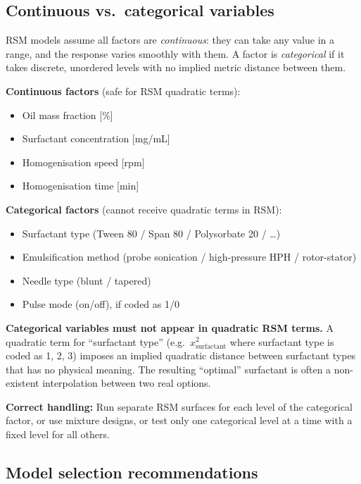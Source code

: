 \documentclass[11pt,a4paper]{article}
\begin{document}
\subsection{Continuous vs.\ categorical variables}

RSM models assume all factors are \emph{continuous}: they can take any
value in a range, and the response varies smoothly with them. A factor
is \emph{categorical} if it takes discrete, unordered levels with no
implied metric distance between them.

\textbf{Continuous factors} (safe for RSM quadratic terms):
\begin{itemize}[leftmargin=1.4em,itemsep=1pt]
\item Oil mass fraction [\%]
\item Surfactant concentration [mg/mL]
\item Homogenisation speed [rpm]
\item Homogenisation time [min]
\end{itemize}

\textbf{Categorical factors} (cannot receive quadratic terms in RSM):
\begin{itemize}[leftmargin=1.4em,itemsep=1pt]
\item Surfactant type (Tween 80 / Span 80 / Polysorbate 20 / \ldots)
\item Emulsification method (probe sonication / high-pressure HPH /
  rotor-stator)
\item Needle type (blunt / tapered)
\item Pulse mode (on/off), if coded as 1/0
\end{itemize}

\begin{warningbox}
\textbf{Categorical variables must not appear in quadratic RSM terms.}
A quadratic term for ``surfactant type'' (e.g.\ $x_\mathrm{surfactant}^2$
where surfactant type is coded as 1, 2, 3) imposes an implied quadratic
distance between surfactant types that has no physical meaning. The
resulting ``optimal'' surfactant is often a non-existent interpolation
between two real options.

\medskip\textbf{Correct handling:} Run separate RSM surfaces for each
level of the categorical factor, or use mixture designs, or test only
one categorical level at a time with a fixed level for all others.
\end{warningbox}

\subsection{Model selection recommendations}
\end{document}
